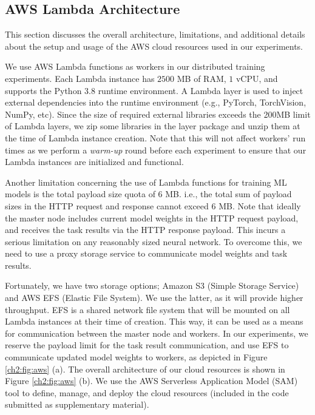 \FloatBarrier


\subsection{AWS Lambda Architecture}\label{ch2:sec:lambda}

This section discusses the overall architecture, limitations, and additional details about the setup and usage of the AWS cloud resources used in our experiments. 

We use AWS Lambda functions as workers in our distributed training experiments. Each Lambda instance has $2500$ MB of RAM, $1$ vCPU, and supports the Python 3.8 runtime environment. A Lambda layer is used to inject external dependencies into the runtime environment (e.g., PyTorch, TorchVision, NumPy, etc). Since the size of required external libraries exceeds the 200MB limit of Lambda layers, we zip some libraries in the layer package and unzip them at the time of Lambda instance creation. Note that this will not affect workers' run times as we perform a \textit{warm-up} round before each experiment to ensure that our Lambda instances are initialized and functional. 

Another limitation concerning the use of Lambda functions for training ML models is the total payload size quota of $6$ MB. i.e., the total sum of payload sizes in the HTTP request and response cannot exceed $6$ MB. Note that ideally the master node includes current model weights in the HTTP request payload, and receives the task results via the HTTP response payload. This incurs a serious limitation on any reasonably sized neural network. To overcome this, we need to use a proxy storage service to communicate model weights and task results.

Fortunately, we have two storage options; Amazon S3 (Simple Storage Service) and AWS EFS (Elastic File System). We use the latter, as it will provide higher throughput. EFS is a shared network file system that will be mounted on all Lambda instances at their time of creation. This way, it can be used as a means for communication between the master node and workers. In our experiments, we reserve the payload limit for the task result communication, and use EFS to communicate updated model weights to workers, as depicted in Figure \ref{ch2:fig:aws} (a). The overall architecture of our cloud resources is shown in Figure \ref{ch2:fig:aws} (b). We use the AWS Serverless Application Model (SAM) tool to define, manage, and deploy the cloud resources (included in the code submitted as supplementary material).  

